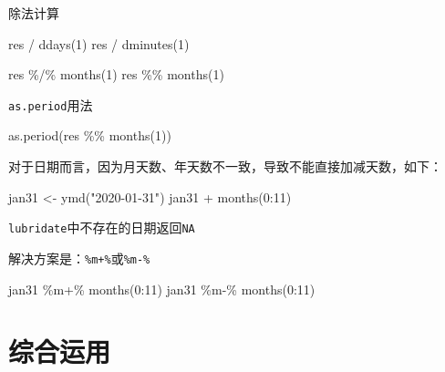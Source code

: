 \documentclass[
]{book}
\newenvironment{Shaded}{\begin{snugshade}}{\end{snugshade}}
\newcommand{\DecValTok}[1]{\textcolor[rgb]{0.00,0.00,0.81}{#1}}
\newcommand{\FunctionTok}[1]{\textcolor[rgb]{0.00,0.00,0.00}{#1}}
\newcommand{\NormalTok}[1]{#1}
\newcommand{\OtherTok}[1]{\textcolor[rgb]{0.56,0.35,0.01}{#1}}
\newcommand{\SpecialCharTok}[1]{\textcolor[rgb]{0.00,0.00,0.00}{#1}}
\newcommand{\StringTok}[1]{\textcolor[rgb]{0.31,0.60,0.02}{#1}}
\begin{document}
除法计算

\begin{Shaded}
\begin{Highlighting}[]
\NormalTok{res }\SpecialCharTok{/} \FunctionTok{ddays}\NormalTok{(}\DecValTok{1}\NormalTok{)}
\NormalTok{res }\SpecialCharTok{/} \FunctionTok{dminutes}\NormalTok{(}\DecValTok{1}\NormalTok{)}


\NormalTok{res }\SpecialCharTok{\%/\%} \FunctionTok{months}\NormalTok{(}\DecValTok{1}\NormalTok{)}
\NormalTok{res }\SpecialCharTok{\%\%} \FunctionTok{months}\NormalTok{(}\DecValTok{1}\NormalTok{)}
\end{Highlighting}
\end{Shaded}

\texttt{as.period}用法

\begin{Shaded}
\begin{Highlighting}[]
\FunctionTok{as.period}\NormalTok{(res }\SpecialCharTok{\%\%} \FunctionTok{months}\NormalTok{(}\DecValTok{1}\NormalTok{))}
\end{Highlighting}
\end{Shaded}

对于日期而言，因为月天数、年天数不一致，导致不能直接加减天数，如下：

\begin{Shaded}
\begin{Highlighting}[]
\NormalTok{jan31 }\OtherTok{\textless{}{-}} \FunctionTok{ymd}\NormalTok{(}\StringTok{"2020{-}01{-}31"}\NormalTok{)}
\NormalTok{jan31 }\SpecialCharTok{+} \FunctionTok{months}\NormalTok{(}\DecValTok{0}\SpecialCharTok{:}\DecValTok{11}\NormalTok{)}
\end{Highlighting}
\end{Shaded}

\texttt{lubridate}中不存在的日期返回\texttt{NA}

解决方案是：\texttt{\%m+\%}或\texttt{\%m-\%}

\begin{Shaded}
\begin{Highlighting}[]
\NormalTok{jan31 }\SpecialCharTok{\%m+\%} \FunctionTok{months}\NormalTok{(}\DecValTok{0}\SpecialCharTok{:}\DecValTok{11}\NormalTok{)}
\NormalTok{jan31 }\SpecialCharTok{\%m{-}\%} \FunctionTok{months}\NormalTok{(}\DecValTok{0}\SpecialCharTok{:}\DecValTok{11}\NormalTok{)}
\end{Highlighting}
\end{Shaded}

\hypertarget{datetime:application}{%
\section{综合运用}\label{datetime:application}}
\end{document}
